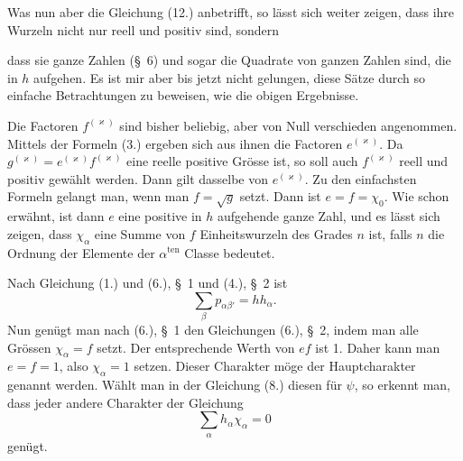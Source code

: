 \documentclass[11pt]{article}
\begin{document}
Was nun aber die Gleichung (12.) anbetrifft, so lässt sich weiter zeigen, dass ihre Wurzeln nicht nur reell und positiv sind, sondern


dass sie ganze Zahlen (\S~6) und sogar die Quadrate von ganzen Zahlen sind, die in $h$ aufgehen. Es ist mir aber bis jetzt nicht gelungen, diese Sätze durch so einfache Betrachtungen zu beweisen, wie die obigen Ergebnisse.

Die Factoren $f^{(\varkappa)}$ sind bisher beliebig, aber von Null verschieden angenommen. Mittels der Formeln (3.) ergeben sich aus ihnen die Factoren $e^{(\varkappa)}$. Da $g^{(\varkappa)}=e^{(\varkappa)}f^{(\varkappa)}$ eine reelle positive Grösse ist, so soll auch $f^{(\varkappa)}$ reell und positiv gewählt werden. Dann gilt dasselbe von $e^{(\varkappa)}$. Zu den einfachsten Formeln gelangt man, wenn man $f=\sqrt{g}$ setzt. Dann ist $e=f=\chi_0$. Wie schon erwähnt, ist dann $e$ eine positive in $h$ aufgehende ganze Zahl, und es lässt sich zeigen, dass $\chi_\alpha$ eine Summe von $f$ Einheitswurzeln des Grades $n$ ist, falls $n$ die Ordnung der Elemente der $\alpha^{\text{ten}}$ Classe bedeutet.

Nach Gleichung (1.) und (6.), \S~1 und (4.), \S~2 ist
\begin{equation*}\tag{14.}
\sum_\beta p_{\alpha\beta'}=h h_\alpha.
\end{equation*}
Nun genügt man nach (6.), \S~1 den Gleichungen (6.), \S~2, indem man alle Grössen $\chi_\alpha=f$ setzt. Der entsprechende Werth von $ef$ ist 1. Daher kann man $e=f=1$, also $\chi_\alpha=1$ setzen. Dieser Charakter möge der Hauptcharakter genannt werden. Wählt man in der Gleichung (8.) diesen für $\psi$, so erkennt man, dass jeder andere Charakter der Gleichung
\begin{equation*}\tag{15.}
\sum_\alpha h_\alpha\chi_\alpha=0
\end{equation*}
genügt.
\end{document}
